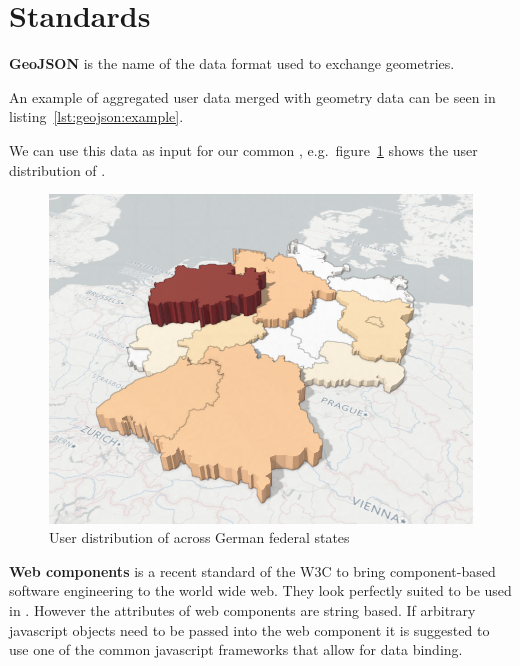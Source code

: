 \section{Standards}

\textbf{GeoJSON} is the name of the data format used to exchange geometries.

An example of aggregated user data merged with geometry data can be seen in listing~\ref{lst:geojson:example}.


We can use this data as input for our common \visan{}, e.g.\ figure~\ref{fig:implementation:user_distribution} shows the user distribution of \rufu{}.

\begin{figure}[h!]
  \centering
  \includegraphics[width=\textwidth]{images/ua_example.png}
  \caption{%
    User distribution of \rufu{} across German federal states
  }\label{fig:implementation:user_distribution}
\end{figure}

\textbf{Web components} is a recent standard of the W3C\cite{W3C2017} to bring component-based software engineering to the world wide web.
They look perfectly suited to be used in \cmvs{}.
However the attributes of web components are string based.
If arbitrary javascript objects need to be passed into the web component it is suggested to use one of the common javascript frameworks that allow for data binding.

